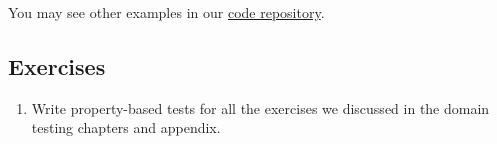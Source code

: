 \begin{Shaded}
\begin{Highlighting}[]
\NormalTok{\textgreater{} }\NormalTok{() \{}
        \NormalTok{()}
\NormalTok{(}\NormalTok{)}
\NormalTok{ == }\NormalTok{)}
\NormalTok{ != }\NormalTok{);}
\NormalTok{    \}}

\NormalTok{\textgreater{} }\NormalTok{() \{}
        \NormalTok{()}
\NormalTok{(}\NormalTok{)}
\NormalTok{ == }\NormalTok{)}
\NormalTok{ == }\NormalTok{);}
\NormalTok{    \}}

\NormalTok{\textgreater{} }\NormalTok{() \{}
        \NormalTok{(}\NormalTok{);}
\NormalTok{    \}}
\NormalTok{\}}
\end{Highlighting}
\end{Shaded}

You may see other examples in our
\href{https://www.github.com/sttp-book/code-examples}{code repository}.

\hypertarget{exercises}{%
\subsection{Exercises}\label{exercises}}

\begin{enumerate}
\def\labelenumi{\arabic{enumi}.}
\tightlist
\item
  Write property-based tests for all the exercises we discussed in the
  domain testing chapters and appendix.
\end{enumerate}
